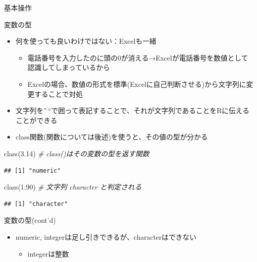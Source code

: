 \documentclass[
  ignorenonframetext,
]{beamer}
\newenvironment{Shaded}{\begin{snugshade}}{\end{snugshade}}
\newcommand{\CommentTok}[1]{\textcolor[rgb]{0.56,0.35,0.01}{\textit{#1}}}
\newcommand{\FloatTok}[1]{\textcolor[rgb]{0.00,0.00,0.81}{#1}}
\newcommand{\FunctionTok}[1]{\textcolor[rgb]{0.00,0.00,0.00}{#1}}
\newcommand{\NormalTok}[1]{#1}
\newcommand{\StringTok}[1]{\textcolor[rgb]{0.31,0.60,0.02}{#1}}
\providecommand{\tightlist}{%
  \setlength{\itemsep}{0pt}\setlength{\parskip}{0pt}}
\begin{document}
\begin{frame}[fragile]{基本操作}
\begin{block}{変数の型}
\begin{itemize}
  \begin{itemize}
  \tightlist
  \item
    何を使っても良いわけではない：Excelも一緒

    \begin{itemize}
    \tightlist
    \item
      電話番号を入力したのに頭の0が消える→Excelが電話番号を数値として認識してしまっているから
    \item
      Excelの場合、数値の形式を標準(Excelに自己判断させる)から文字列に変更することで対処
    \end{itemize}
  \item
    文字列を''\,``で囲って表記することで、それが文字列であることをRに伝えることができる
  \item
    class関数(関数については後述)を使うと、その値の型が分かる
  \end{itemize}
\end{itemize}

\begin{Shaded}
\begin{Highlighting}[]
\FunctionTok{class}\NormalTok{(}\FloatTok{3.14}\NormalTok{) }\CommentTok{\# class()はその変数の型を返す関数}
\end{Highlighting}
\end{Shaded}

\begin{verbatim}
## [1] "numeric"
\end{verbatim}

\begin{Shaded}
\begin{Highlighting}[]
\FunctionTok{class}\NormalTok{(}\StringTok{\textquotesingle{}1.90\textquotesingle{}}\NormalTok{) }\CommentTok{\# 文字列 character と判定される}
\end{Highlighting}
\end{Shaded}

\begin{verbatim}
## [1] "character"
\end{verbatim}
\end{block}

\begin{block}{変数の型(cont'd)}
\protect\hypertarget{ux5909ux6570ux306eux578bcontd}{}
\begin{itemize}
\tightlist
\item
  numeric, integerは足し引きできるが、characterはできない

  \begin{itemize}
  \tightlist
  \item
    integerは整数
  \end{itemize}
\end{itemize}


\end{block}
\end{frame}
\end{document}

